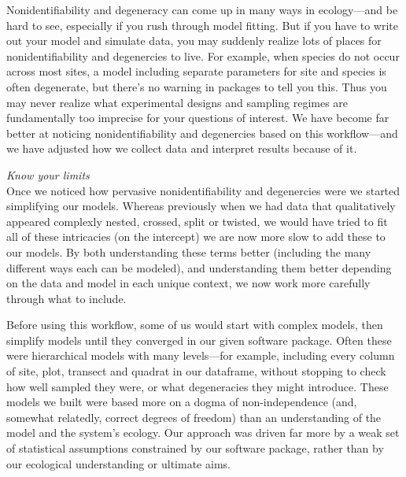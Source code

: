 \documentclass[11pt]{article}
\begin{document}
{%
Nonidentifiability and degeneracy can come up in many ways in ecology---and be hard to see, especially if you rush through model fitting. But if you have to write out your model and simulate data, you may suddenly realize lots of places for nonidentifiability and degenercies to live. For example, when species do not occur across most sites, a model including separate parameters for site and species is often degenerate, but there's no warning in packages to tell you this. Thus you may never realize what experimental designs and sampling regimes are fundamentally too imprecise for your questions of interest. We have become far better at noticing nonidentifiability and degenercies based on this workflow---and we have adjusted how we collect data and interpret results because of it. %

 \emph{Know your limits} \\ %
Once we noticed how pervasive nonidentifiability and degenercies were we started simplifying our models. Whereas previously when we had data that qualitatively appeared complexly nested, crossed, split or twisted, we would have tried to fit all of these intricacies (on the intercept) we are now more slow to add these to our models. By both understanding these terms better (including the many different ways each can be modeled), and understanding them better depending on the data and model in each unique context, we now work more carefully through what to include. %

Before using this workflow, some of us would start with complex models, then simplify models until they converged in our given software package. Often these were hierarchical models with many levels---for example, including every column of site, plot, transect and quadrat in our dataframe, without stopping to check how well sampled they were, or what degeneracies they might introduce. These models we built were based more on a dogma of non-independence (and, somewhat relatedly, correct degrees of freedom) than an understanding of the model and the system's ecology. Our approach was driven far more by a weak set of statistical assumptions constrained by our software package, rather than by our ecological understanding or ultimate aims. 

}
\end{document}
